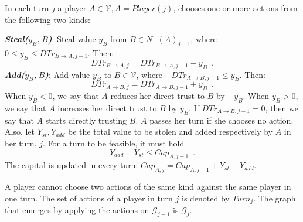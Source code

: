 \begin{definition}[Turns]
  In each turn $j$ a player $A \in \mathcal{V}, A = Player\left(j\right)$, chooses one or more actions from the following two
  kinds:

  \noindent \textit{\textbf{Steal($y_B$,$\:B$)}}: Steal value $y_B$ from $B \in N^{-}\left(A\right)_{j-1}$, where
  $0 \leq y_B \leq DTr_{B \rightarrow A, j-1}$. Then:
  \begin{equation*}
     DTr_{B \rightarrow A, j} = DTr_{B \rightarrow A, j-1} - y_B \enspace.
  \end{equation*}
  \noindent \textit{\textbf{Add($y_B$,$\:B$)}}:
  Add value $y_B$ to $B \in \mathcal{V}$, where $-DTr_{A \rightarrow B, j-1} \leq y_B$. Then:
  \begin{equation*}
     DTr_{A \rightarrow B, j} = DTr_{A \rightarrow B, j-1} + y_B \enspace.
  \end{equation*}
  When $y_B < 0$, we say that $A$ reduces her direct trust to $B$ by $-y_B$. When $y_B > 0$, we say that $A$ increases her
  direct trust to $B$ by $y_B$. If $DTr_{A \rightarrow B, j-1} = 0$, then we say that $A$ starts directly trusting $B$.
  $A$ passes her turn if she chooses no action. Also, let $Y_{st}, Y_{add}$ be the
  total value to be stolen and added respectively by $A$ in her turn, $j$. For a turn to be feasible, it must hold
  \begin{equation}
     Y_{add} - Y_{st} \leq Cap_{A, j-1} \enspace.
  \end{equation}
  The capital is updated in every turn: $Cap_{A, j} = Cap_{A, j-1} + Y_{st} - Y_{add}$.

  A player cannot choose two actions of the same kind against the same player in one turn.
  The set of actions of a player in turn $j$ is denoted by $Turn_j$. The graph that emerges by applying
  the actions on $\mathcal{G}_{j-1}$ is $\mathcal{G}_j$.
\end{definition}
